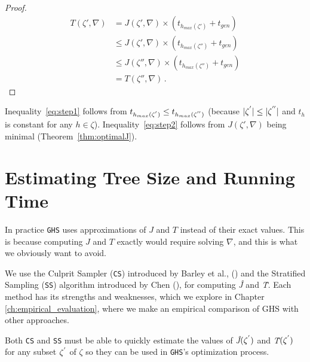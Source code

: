 \begin{proof}
\begin{align}
T(\zeta', \nabla) &= J(\zeta', \nabla) \times (t_{h_{max}(\zeta')} + t_{gen}) \\
&\le J(\zeta', \nabla) \times (t_{h_{max}(\zeta'')} + t_{gen}) \label{eq:step1} \\
&\le J(\zeta'', \nabla) \times (t_{h_{max}(\zeta'')} + t_{gen}) \label{eq:step2} \\
&= T(\zeta'', \nabla) \,.
\end{align}
\end{proof}
Inequality~\ref{eq:step1} follows from $t_{h_{max}(\zeta\sp{'})} \leq t_{h_{max}(\zeta\sp{''})}$ (because $|\zeta\sp{'}| \leq |\zeta\sp{''}|$ and $t_h$ is constant for any $h\in\zeta$). Inequality~\ref{eq:step2} follows from $J(\zeta', \nabla)$ being minimal (Theorem~\ref{thm:optimalJ}).
\fi 
 

\section{Estimating Tree Size and Running Time}
In  practice \texttt{GHS} uses approximations of $J$ and $T$ instead of their exact values. This is because computing $J$ and $T$ exactly would require solving $\nabla$, and this is what we obviously want to avoid.

We use the Culprit Sampler (\texttt{CS}) introduced by Barley et al., (\citeyear{BarleySantiagoOver}) and the Stratified Sampling (\texttt{SS}) algorithm introduced by Chen (\citeyear{chen1992heuristic}), for computing \textit{\^{J}} and \textit{\^{T}}. Each method has its strengths and weaknesses, which we explore in Chapter \ref{ch:empirical_evaluation}, where we make an empirical comparison of GHS with other approaches. 

Both \texttt{CS} and \texttt{SS} must be able to quickly estimate the values of \textit{\^{J}}$(\zeta\sp{'})$ and \textit{\^{T}}$(\zeta\sp{'})$ for any subset $\zeta\sp{'}$ of $\zeta$ so they can be used in \texttt{GHS}'s optimization process.

